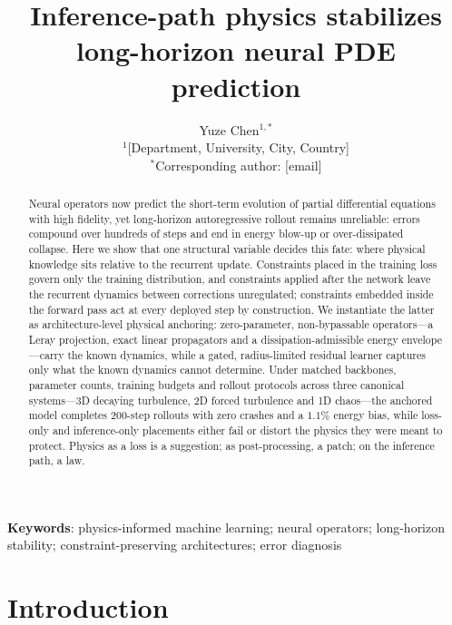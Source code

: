 \documentclass[11pt,a4paper]{article}
\title{\bfseries Inference-path physics stabilizes\\ long-horizon neural PDE prediction}
\author{Yuze Chen$^{1,*}$\\[4pt]
\normalsize $^{1}$[Department, University, City, Country]\\
\normalsize $^{*}$Corresponding author: [email]}
\date{}
\begin{document}
\maketitle

\begin{abstract}
\noindent Neural operators now predict the short-term evolution of partial differential equations with high fidelity, yet long-horizon autoregressive rollout remains unreliable: errors compound over hundreds of steps and end in energy blow-up or over-dissipated collapse. Here we show that one structural variable decides this fate: where physical knowledge sits relative to the recurrent update. Constraints placed in the training loss govern only the training distribution, and constraints applied after the network leave the recurrent dynamics between corrections unregulated; constraints embedded inside the forward pass act at every deployed step by construction. We instantiate the latter as architecture-level physical anchoring: zero-parameter, non-bypassable operators---a Leray projection, exact linear propagators and a dissipation-admissible energy envelope---carry the known dynamics, while a gated, radius-limited residual learner captures only what the known dynamics cannot determine. Under matched backbones, parameter counts, training budgets and rollout protocols across three canonical systems---3D decaying turbulence, 2D forced turbulence and 1D chaos---the anchored model completes 200-step rollouts with zero crashes and a $1.1\%$ energy bias, while loss-only and inference-only placements either fail or distort the physics they were meant to protect. Physics as a loss is a suggestion; as post-processing, a patch; on the inference path, a law.
\end{abstract}

\noindent\textbf{Keywords}: physics-informed machine learning; neural operators; long-horizon stability; constraint-preserving architectures; error diagnosis

\section*{Introduction}
\end{document}

